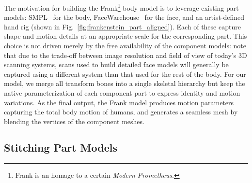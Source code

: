 The motivation for building the Frank\footnote{Frank is an homage to a certain \emph{Modern Prometheus}.} body model is to leverage existing part models: SMPL~\cite{Loper2015} for the body, FaceWarehouse~\cite{cao2014facewarehouse} for the face, and an artist-defined hand rig (shown in Fig.~\ref{fig:frankenstein_part_aligned}). Each of these capture shape and motion details at an appropriate scale for the corresponding part.
This choice is not driven merely by the free availability of the component models: note that due to the trade-off between image resolution and field of view of today's 3D scanning systems, scans used to build detailed face models will generally be captured using a different system than that used for the rest of the body.
For our model, we merge all transform bones into a single skeletal hierarchy but keep the native parameterization of each component part to express identity and motion variations. As the final output, the Frank model produces motion parameters capturing the total body motion of humans, and generates a seamless mesh by blending the vertices of the component meshes. 

\subsection{Stitching Part Models}

